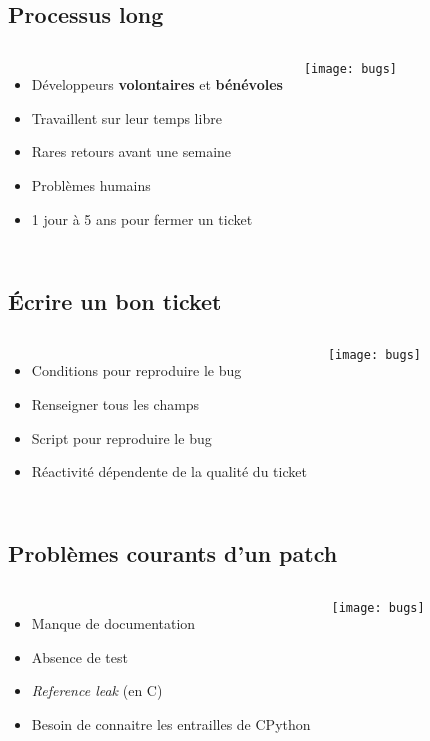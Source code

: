 \documentclass[handout]{beamer}
\begin{document}
\subsection{Processus long}
\frame
{
    \begin{columns}[c]
            \begin{itemize}
            \item Développeurs \textbf{volontaires} et \textbf{bénévoles}
            \item Travaillent sur leur temps libre
            \item Rares retours avant une semaine
            \item Problèmes humains
            \item 1 jour à 5 ans pour fermer un ticket
            \end{itemize}
            \texttt{[image: bugs]}
    \end{columns}
}

\subsection{Écrire un bon ticket}
\frame
{
    \begin{columns}[c]
            \begin{itemize}
            \item Conditions pour reproduire le bug
            \item Renseigner tous les champs
            \item Script pour reproduire le bug
            \item Réactivité dépendente de la qualité du ticket
            \end{itemize}
            \texttt{[image: bugs]}
    \end{columns}
}

\subsection{Problèmes courants d'un patch}
\frame
{
    \begin{columns}[c]
            \begin{itemize}
            \item Manque de documentation
            \item Absence de test
            \item \textit{Reference leak} (en C)
            \item Besoin de connaitre les entrailles de CPython
            \end{itemize}
            \texttt{[image: bugs]}
    \end{columns}
}
\end{document}
